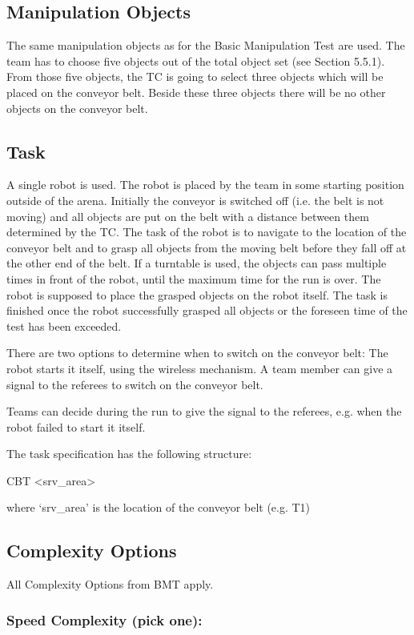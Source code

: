 \subsection{Manipulation Objects}
The same manipulation objects as for the Basic Manipulation Test are used. The team has to choose five objects out of the total object set (see Section 5.5.1). From those five objects, the TC is going to select three objects which will be placed on the conveyor belt. Beside these three objects there will be no other objects on the conveyor belt.

\subsection{Task}
A single robot is used. The robot is placed by the team in some starting position outside of the arena. Initially the conveyor is switched off (i.e. the belt is not moving) and all objects are put on the belt with a distance between them determined by the TC. The task of the robot is to navigate to the location of the conveyor belt and to grasp all objects from the moving belt before they fall off at the other end of the belt. If a turntable is used, the objects can pass multiple times in front of the robot, until the maximum time for the run is over. The robot is supposed to place the grasped objects on the robot itself. The task is finished once the robot successfully grasped all objects or the foreseen time of the test has been exceeded. 
\par
There are two options to determine when to switch on the conveyor belt:
The robot starts it itself, using the wireless mechanism.
A team member can give a signal to the referees to switch on the conveyor belt.
\par
Teams can decide during the run to give the signal to the referees, e.g. when the robot failed to start it itself. 
\par
The task specification has the following structure:
\par
CBT \textless srv\_area\textgreater
\par
where ‘srv\_area’ is the location of the conveyor belt (e.g. T1)

\subsection{Complexity Options}
All Complexity Options from BMT apply.


\subsubsection{Speed Complexity (pick one):}

